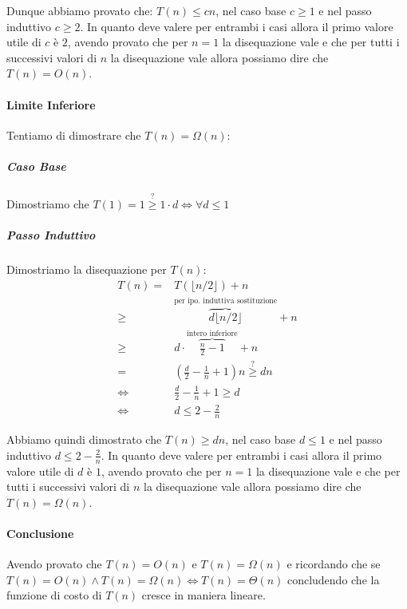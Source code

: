                 Dunque abbiamo provato che: $ T(n) \leq cn $, nel caso base $ c\geq 1 $ e nel passo induttivo $ c\geq 2 $. In quanto deve valere per entrambi i casi allora il primo valore utile di $ c $ è $2$, avendo provato che per $ n=1 $ la disequazione vale e che per tutti i successivi valori di $ n $ la disequazione vale allora possiamo dire che $ T(n) = O(n) $.
            \paragraph{Limite Inferiore}
                Tentiamo di dimostrare che $ T(n) = \Omega(n) $:
                \subparagraph{Caso Base} Dimostriamo che $ T(1) = 1 \stackrel{?}{\geq} 1\cdot d \Leftrightarrow \forall d\leq 1 $
                \newpage %
                \subparagraph{Passo Induttivo} Dimostriamo la disequazione per $ T(n) $:
                $$
                    \begin{aligned}
                        T(n) =& T(\lfloor n/2 \rfloor) + n \\
                        \geq & \overbrace{d\lfloor n/2 \rfloor}^{\text{per ipo. induttiva sostituzione}} + n \\
                        \geq & d\cdot\overbrace{\frac{n}2-1}^{\text{intero inferiore}} + n \\
                        = & \left(\frac{d}2-\frac1n+1\right)n \stackrel{?}{\geq} dn \\
                        \Leftrightarrow & \frac{d}2-\frac1n+1 \geq d \\ 
                        \Leftrightarrow & d\leq 2 - \frac2n
                    \end{aligned}
                $$

                Abbiamo quindi dimostrato che $ T(n) \geq dn $, nel caso base $ d\leq 1 $ e nel passo induttivo $ d\leq 2 - \frac2n $. In quanto deve valere per entrambi i casi allora il primo valore utile di $ d $ è $1$, avendo provato che per $ n=1 $ la disequazione vale e che per tutti i successivi valori di $ n $ la disequazione vale allora possiamo dire che $ T(n) = \Omega(n) $.
                
            \paragraph{Conclusione} Avendo provato che $ T(n) = O(n) $ e $ T(n) = \Omega(n) $ e ricordando che se $ T(n) = O(n) \land T(n) = \Omega(n) \Leftrightarrow T(n) = \Theta(n) $ concludendo che la funzione di costo di $ T(n) $ cresce in maniera lineare.
